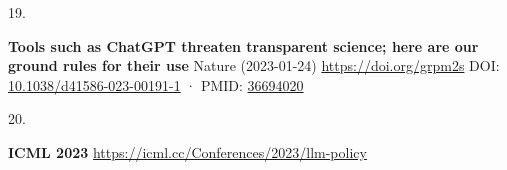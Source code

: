 \documentclass[
]{article}
\newlength{\cslhangindent}
\newlength{\csllabelwidth}
\newlength{\cslentryspacingunit} %
\newenvironment{CSLReferences}[2] %
 {%
  \setlength{\parindent}{0pt}
  \ifodd #1
  \let\oldpar\par
  \def\par{\hangindent=\cslhangindent\oldpar}
  \fi
  \setlength{\parskip}{#2\cslentryspacingunit}
 }%
 {}
\newcommand{\CSLBlock}[1]{#1\hfill\break}
\newcommand{\CSLLeftMargin}[1]{\parbox[t]{\csllabelwidth}{#1}}
\newcommand{\CSLRightInline}[1]{\parbox[t]{\linewidth - \csllabelwidth}{#1}\break}
\begin{document}
\begin{CSLReferences}{0}{0}
\leavevmode{}%
\CSLLeftMargin{19. }%
\CSLRightInline{\textbf{Tools such as ChatGPT threaten transparent science; here are our ground rules for their use}
\CSLBlock{Nature} (2023-01-24) \url{https://doi.org/grpm2s}
\CSLBlock{DOI: \href{https://doi.org/10.1038/d41586-023-00191-1}{10.1038/d41586-023-00191-1} · PMID: \href{https://www.ncbi.nlm.nih.gov/pubmed/36694020}{36694020}}}

\leavevmode{}%
\CSLLeftMargin{20. }%
\CSLRightInline{\textbf{ICML 2023} \url{https://icml.cc/Conferences/2023/llm-policy}}

\end{CSLReferences}
\end{document}
